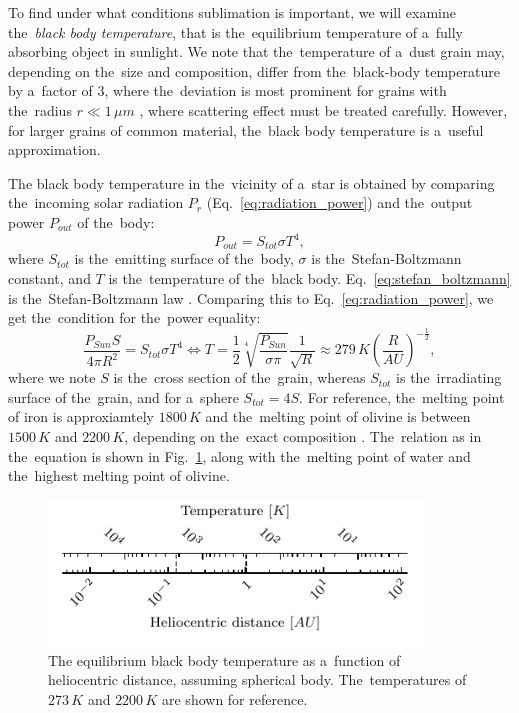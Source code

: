 To find under what conditions sublimation is important, we will examine the~\textit{black body temperature}, that is the~equilibrium temperature of a~fully absorbing object in sunlight. We note that the~temperature of a~dust grain may, depending on the~size and composition, differ from the~black-body temperature by a~factor of $3$, where the~deviation is most prominent for grains with the~radius $r \ll 1 \, \si{\mu m}$ \citep{myrvang2018temperature}, where scattering effect must be treated carefully. However, for larger grains of common material, the~black body temperature is a~useful approximation. 

The black body temperature in the~vicinity of a~star is obtained by comparing the~incoming solar radiation $P_{r}$ (Eq.~\ref{eq:radiation_power}) and the~output power $P_{out}$ of the~body:
\begin{equation}
    P_{out} = S_{tot} \sigma T^4,
    \label{eq:stefan_boltzmann}
\end{equation}
where $S_{tot}$ is the~emitting surface of the~body, $\sigma$ is the~Stefan-Boltzmann constant, and $T$ is the~temperature of the~black body. Eq.~\ref{eq:stefan_boltzmann} is the~Stefan-Boltzmann law \citep{stefan1879uber,boltzmann1884ableitnung}. Comparing this to Eq.~\ref{eq:radiation_power}, we get the~condition for the~power equality:
\begin{equation}
    \frac{P_{Sun} S}{4 \pi R^2} = S_{tot} \sigma T^4 \Leftrightarrow T =  \frac{1}{2} \sqrt[4]{\frac{P_{Sun}}{\sigma \pi}} \frac{1}{\sqrt{R}} \approx 279 \, \si{K} \left(\frac{R}{\si{AU}}\right)^{-\frac{1}{2}}, 
\end{equation}
where we note $S$ is the~cross section of the~grain, whereas $S_{tot}$ is the~irradiating surface of the~grain, and for a~sphere $S_{tot} = 4S$. For reference, the~melting point of iron is approxiamtely $1800 \, \si{K}$ and the~melting point of olivine is between $1500 \, \si{K}$ and $2200 \, \si{K}$, depending on the~exact composition \citep{liu1975melting,pinti2015olivine}. The~relation as in the~equation is shown in Fig.~\ref{fig:black_body_temperature}, along with the~melting point of water and the~highest melting point of olivine.

\begin{figure}[ht]
 	\centering
 	\includegraphics[width=10cm]{figures/distance_temperature_ruler.pdf}
 	\caption{The equilibrium black body temperature as a~function of heliocentric distance, assuming spherical body. The~temperatures of $273 \, \si{K}$ and $2200 \, \si{K}$ are shown for reference.}
 	\label{fig:black_body_temperature}
\end{figure}

